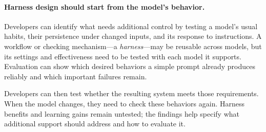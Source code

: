 \paragraph{Harness design should start from the model's behavior.}
Developers can identify what needs additional control by testing a model's
usual habits, their persistence under changed inputs, and its response to
instructions. A workflow or checking mechanism---a \emph{harness}---may
be reusable across models, but its settings and effectiveness need to be tested
with each model it supports. Evaluation can show which desired behaviors a
simple prompt already produces reliably and which important failures remain.

Developers can then test whether the resulting system meets those requirements.
When the model changes, they need to check these behaviors again. Harness
benefits and learning gains remain untested; the findings help specify what
additional support should address and how to evaluate it.
